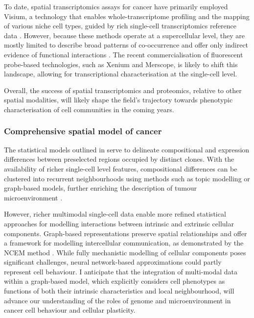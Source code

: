 To date, spatial transcriptomics assays for cancer have primarily employed \ac{Visium}, a technology that enables whole-transcriptome profiling and the mapping of various niche cell types, guided by rich single-cell transcriptomics reference data \parencite{Andersson2021-pu, Stahl2016-nq, Wu2021-uq, Berglund2018-gh, Moncada2020-ck, Qi2022-by, Ji2020-gn, Ravi2022-ut, Wu2021-wb, Gouin2021-zx, Barkley2022-gx, Erickson2022-zh}. However, because these methods operate at a supercellular level, they are mostly limited to describe broad patterns of co-occurrence and offer only indirect evidence of functional interactions . The recent commercialisation of fluorescent probe-based technologies, such as \ac{Xenium} and \ac{Merscope}, is likely to shift this landscape, allowing for transcriptional characterisation at the single-cell level.

Overall, the success of spatial transcriptomics and proteomics, relative to other spatial modalities, will likely shape the field's trajectory towards phenotypic characterisation of cell communities in the coming years.

\subsubsection*{Comprehensive spatial model of cancer}

The statistical models outlined in  serve to delineate compositional and expression differences between preselected regions occupied by distinct clones. With the availability of richer single-cell level features, compositional differences can be clustered into recurrent neighbourhoods using methods such as topic modelling or graph-based models, further enriching the description of tumour microenvironment \parencite{Danenberg2022-zb, Jackson2020-em, Nirmal2022-sq, Schurch2020-lp, Wang2023-bo}.

However, richer multimodal single-cell data enable more refined statistical approaches for modelling interactions between intrinsic and extrinsic cellular components. Graph-based representations preserve spatial relationships and offer a framework for modelling intercellular communication, as demonstrated by the NCEM method \parencite{Fischer2023-go}. While fully mechanistic modelling of cellular components poses significant challenges, neural network-based approximations could partly represent cell behaviour. I anticipate that the integration of multi-modal data within a graph-based model, which explicitly considers cell phenotypes as functions of both their intrinsic characteristics and local neighbourhood, will advance our understanding of the roles of genome and microenvironment in cancer cell behaviour and cellular plasticity.

